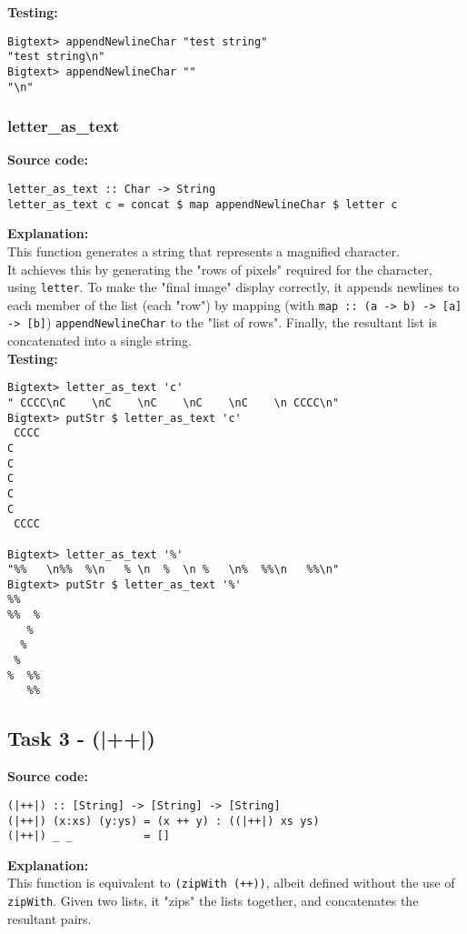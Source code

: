 \documentclass[11pt]{article}
\begin{document}
\textbf{Testing:}
\begin{verbatim}
Bigtext> appendNewlineChar "test string"
"test string\n"
Bigtext> appendNewlineChar ""
"\n"
\end{verbatim}

\subsubsection{letter\_as\_text}
\textbf{Source code:}
\begin{verbatim}
letter_as_text :: Char -> String
letter_as_text c = concat $ map appendNewlineChar $ letter c
\end{verbatim}

\textbf{Explanation:}\\
This function generates a string that represents a magnified character. \\

It achieves this by generating the "rows of pixels" required for the character, using {\verb|letter|}. To make the "final image" display correctly, it appends newlines to each member of the list (each "row") by mapping (with {\verb|map :: (a -> b) -> [a] -> [b]|}) {\verb|appendNewlineChar|} to the "list of rows". Finally, the resultant list is concatenated into a single string. \\

\newpage
\textbf{Testing:}
\begin{verbatim}
Bigtext> letter_as_text 'c'
" CCCC\nC    \nC    \nC    \nC    \nC    \n CCCC\n"
Bigtext> putStr $ letter_as_text 'c'
 CCCC
C    
C    
C    
C    
C    
 CCCC
 
Bigtext> letter_as_text '%'
"%%   \n%%  %\n   % \n  %  \n %   \n%  %%\n   %%\n"
Bigtext> putStr $ letter_as_text '%'
%%   
%%  %
   % 
  %  
 %   
%  %%
   %%

\end{verbatim}

\subsection{Task 3 - (|++|)}
\textbf{Source code:}
\begin{verbatim}
(|++|) :: [String] -> [String] -> [String]
(|++|) (x:xs) (y:ys) = (x ++ y) : ((|++|) xs ys)
(|++|) _ _           = []                       
\end{verbatim}
\textbf{Explanation:}\\
This function is equivalent to {\verb|(zipWith (++))|}, albeit defined without the use of {\verb|zipWith|}. Given two lists, it "zips" the lists together, and concatenates the resultant pairs. \\
\end{document}
